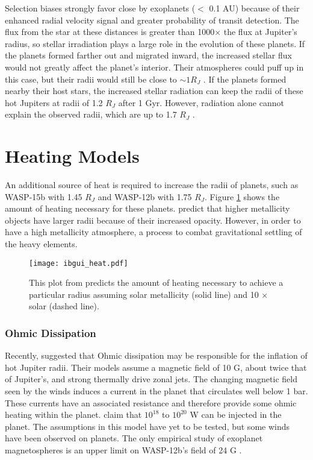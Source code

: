 \documentclass[twocolumn]{emulateapj}
\begin{document}
Selection biases strongly favor close by exoplanets ($< $ 0.1 AU)
because of their enhanced radial velocity signal and greater
probability of transit detection. The flux from the star at these
distances is greater than 1000$\times$ the flux at Jupiter's radius,
so stellar irradiation plays a large role in the evolution of these
planets. If the planets formed farther out and migrated inward, the
increased stellar flux would not greatly affect the planet's
interior. Their atmospheres could puff up in this case, but their
radii would still be close to $\sim 1 R_J$ \citep{burrows2000}. If the
planets formed nearby their host stars, the increased stellar
radiation can keep the radii of these hot Jupiters at radii of 1.2
$R_J$ after 1 Gyr. However, radiation alone cannot explain the
observed radii, which are up to 1.7 $R_J$ \citep{fortneyRev10}.

\section{Heating Models}
An additional source of heat is required to increase the radii of planets, such as WASP-15b with 1.45 $R_J$ and WASP-12b with 1.75 $R_J$. Figure \ref{ibguiheat} shows the amount of heating necessary for these planets. \citet{ibgui2010} predict that higher metallicity objects have larger radii because of their increased opacity. However, in order to have a high metallicity atmosphere, a process to combat gravitational settling of the heavy elements.
\begin{figure}[!htbp]
\begin{center}
\texttt{[image: ibgui\_heat.pdf]}
\caption{This plot from \citet{ibgui2010} predicts the amount of heating necessary to achieve a particular radius assuming solar metallicity (solid line) and 10 $\times$ solar (dashed line).}
\label{ibguiheat}
\end{center}
\end{figure}
\subsubsection{Ohmic Dissipation}
Recently, \citet{batygin10} suggested that Ohmic dissipation may be
responsible for the inflation of hot Jupiter radii. Their models
assume a magnetic field of 10 G, about twice that of Jupiter's, and
strong thermally drive zonal jets. The changing magnetic field seen by
the winds induces a current in the planet that circulates well below 1
bar. These currents have an associated resistance and therefore
provide some ohmic heating within the planet. \citet{batygin10} claim
that $10^18$ to $10^20$ W can be injected in the planet. The
assumptions in this model have yet to be tested, but some winds have
been observed on planets. The only empirical study of exoplanet
magnetospheres is an upper limit on WASP-12b's field of 24 G
\citep{vidotto10}.
\end{document}
